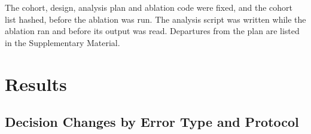 \documentclass[journal]{IEEEtran}
\begin{document}
The cohort, design, analysis plan and ablation code were fixed, and the cohort list hashed, before the ablation was
run. The analysis script was written while the ablation ran and before its output was read. Departures from the
plan are listed in the Supplementary Material.

\section{Results}
\subsection{Decision Changes by Error Type and Protocol}
\end{document}
